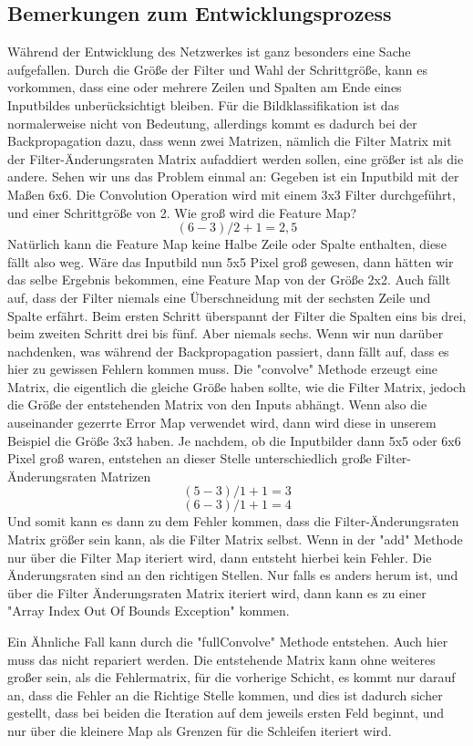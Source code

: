 \documentclass[12pt]{article}
\begin{document}
\subsection{Bemerkungen zum Entwicklungsprozess}
Während der Entwicklung des Netzwerkes ist ganz besonders eine Sache aufgefallen. Durch die Größe der Filter und Wahl der Schrittgröße, kann es vorkommen, dass eine oder mehrere Zeilen und Spalten am Ende eines Inputbildes unberücksichtigt bleiben. Für die Bildklassifikation ist das normalerweise nicht von Bedeutung, allerdings kommt es dadurch bei der Backpropagation dazu, dass wenn zwei Matrizen, nämlich die Filter Matrix mit der Filter-Änderungsraten Matrix aufaddiert werden sollen, eine größer ist als die andere.
Sehen wir uns das Problem einmal an: Gegeben ist ein Inputbild mit der Maßen 6x6. Die Convolution Operation wird mit einem 3x3 Filter durchgeführt, und einer Schrittgröße von 2. Wie groß wird die Feature Map? 
$$(6-3)/2+1 = 2,5$$
Natürlich kann die Feature Map keine Halbe Zeile oder Spalte enthalten, diese fällt also weg. Wäre das Inputbild nun 5x5 Pixel groß gewesen, dann hätten wir das selbe Ergebnis bekommen, eine Feature Map von der Größe 2x2.
Auch fällt auf, dass der Filter niemals eine Überschneidung mit der sechsten Zeile und Spalte erfährt. Beim ersten Schritt überspannt der Filter die Spalten eins bis drei, beim zweiten Schritt drei bis fünf. Aber niemals sechs. 
Wenn wir nun darüber nachdenken, was während der Backpropagation passiert, dann fällt auf, dass es hier zu gewissen Fehlern kommen muss. Die "convolve" Methode erzeugt eine Matrix, die eigentlich die gleiche Größe haben sollte, wie die Filter Matrix, jedoch die Größe der entstehenden Matrix von den Inputs abhängt. Wenn also die auseinander gezerrte Error Map verwendet wird, dann wird diese in unserem Beispiel die Größe 3x3 haben. Je nachdem, ob die Inputbilder dann 5x5 oder 6x6 Pixel groß waren, entstehen an dieser Stelle unterschiedlich große Filter-Änderungsraten Matrizen
$$(5-3)/1+1 = 3$$
$$(6-3)/1+1 = 4$$
Und somit kann es dann zu dem Fehler kommen, dass die Filter-Änderungsraten Matrix größer sein kann, als die Filter Matrix selbst. Wenn in der "add" Methode nur über die Filter Map iteriert wird, dann entsteht hierbei kein Fehler. Die Änderungsraten sind an den richtigen Stellen. Nur falls es anders herum ist, und über die Filter Änderungsraten Matrix iteriert wird, dann kann es zu einer "Array Index Out Of Bounds Exception" kommen. 

Ein Ähnliche Fall kann durch die  "fullConvolve" Methode entstehen. Auch hier muss das nicht repariert werden. Die entstehende Matrix kann ohne weiteres großer sein, als die Fehlermatrix, für die vorherige Schicht, es kommt nur darauf an, dass die Fehler an die Richtige Stelle kommen, und dies ist dadurch sicher gestellt, dass bei beiden die Iteration auf dem jeweils ersten Feld beginnt, und nur über die kleinere Map als Grenzen für die Schleifen iteriert wird.
\end{document}
